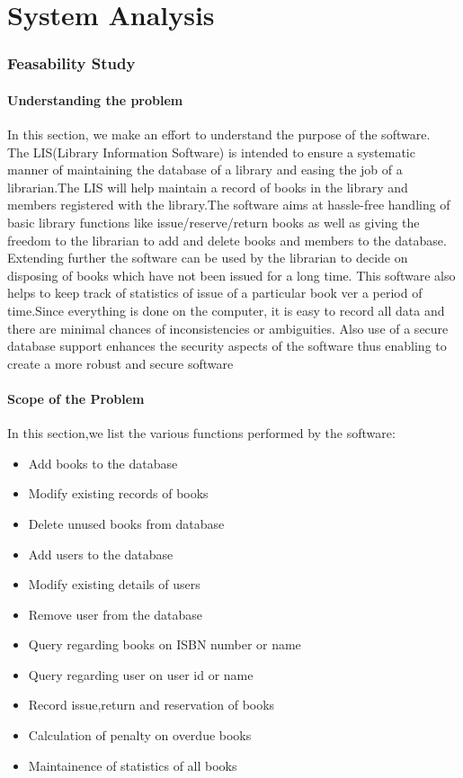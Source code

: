 \documentclass[a4paper]{article}
\author{}
\date{}
\begin{document}

\newpage
\hypertarget{toc}{}
\tableofcontents
\newpage
\part{System Analysis}
\section{Feasability Study}
\subsection{Understanding the problem}
In this section, we make an effort to understand the purpose of the software.
\\
The LIS(Library Information Software) is intended to ensure a systematic manner of maintaining the database of a library and easing the job of a librarian.The LIS will help maintain a record of books in the library and members registered with the library.The software aims at hassle-free handling of basic library functions like issue/reserve/return books as well as giving the freedom to the librarian to add and delete books and members to the database.
	Extending further the software can be used by the librarian to decide on disposing of books which have not been issued for a long time. This software also helps to keep track of statistics of issue of a particular book ver a period of time.Since everything is done on the computer, it is easy to record all data and there are minimal chances of inconsistencies or ambiguities.
Also use of a secure database support enhances the security aspects of the software thus enabling to create a more robust and secure software
\subsection{Scope of the Problem}
In this section,we list the various functions performed by the software:
\begin{itemize}
\item Add books to the database
\item Modify existing records of books
\item Delete unused books from database
\item Add users to the database
\item Modify existing details of users
\item Remove user from the database
\item Query regarding books on ISBN number or name
\item Query regarding user on user id or name
\item Record issue,return and reservation of books
\item Calculation of penalty on overdue books
\item Maintainence of statistics of all books 
\end{itemize}
\end{document}

